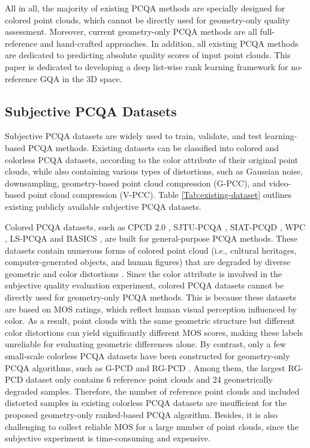 All in all, the majority of existing PCQA methods are specially designed for colored point clouds, which cannot be directly used for geometry-only quality assessment.
Moreover, current geometry-only PCQA methods are all full-reference and hand-crafted approaches.
In addition, all existing  PCQA methods are dedicated to predicting absolute quality scores of input point clouds.
This paper is dedicated to developing a deep list-wise rank learning framework for no-reference GQA in the 3D space.

\subsection{Subjective PCQA Datasets}

Subjective PCQA datasets are widely used to train, validate, and test learning-based PCQA methods.
Existing datasets can be classified into colored and colorless PCQA datasets, according to the color attribute of their original point clouds, while also containing various types of distortions, such as Gaussian noise, downsampling, geometry-based point cloud compression (G-PCC), and video-based point cloud compression (V-PCC).
Table \ref{Tab:existing-dataset} outlines existing publicly available subjective PCQA datasets.



Colored PCQA datasets, such as CPCD 2.0 \citep{Hual21}, SJTU-PCQA \citep{Yangq21}, SIAT-PCQD \citep{wuxj21}, WPC \citep{liuq22}, LS-PCQA \citep{Liuyp22} and BASICS \citep{BASICS2024}, are built for general-purpose PCQA methods.
These datasets contain numerous forms of colored point cloud (i.e., cultural heritages, computer-generated objects, and human figures) that are degraded by diverse geometric and color distortions \citep{Liuyp22}.
Since the color attribute is involved in the subjective quality evaluation experiment, colored PCQA datasets cannot be directly used for geometry-only PCQA methods. 
This is because these datasets are based on MOS ratings, which reflect human visual perception influenced by color. 
As a result, point clouds with the same geometric structure but different color distortions can yield significantly different MOS scores, making these labels unreliable for evaluating geometric differences alone.
By contrast, only a few small-scale colorless PCQA datasets have been constructed for geometry-only PCQA algorithms, such as G-PCD \citep{Alexioue17} and RG-PCD \citep{Alexioue18mex}.
Among them, the largest RG-PCD dataset only contains 6 reference point clouds and 24 geometrically degraded samples.
Therefore, the number of reference point clouds and included distorted samples in existing colorless PCQA datasets are insufficient for the proposed geometry-only ranked-based PCQA algorithm.
Besides, it is also challenging to collect reliable MOS for a large number of point clouds, since the subjective experiment is time-consuming and expensive. 


